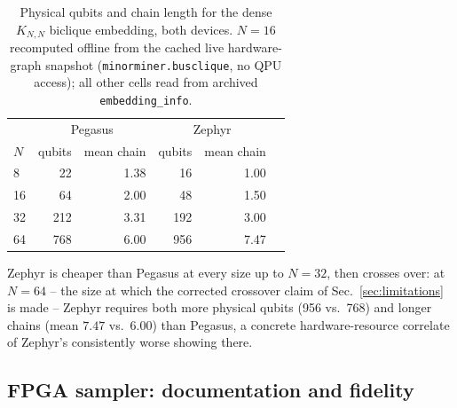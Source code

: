 \begin{table}[h]
\caption{Physical qubits and chain length for the dense $K_{N,N}$ biclique embedding, both devices. $N=16$ recomputed offline from the cached live hardware-graph snapshot (\texttt{minorminer.busclique}, no QPU access); all other cells read from archived \texttt{embedding\_info}.}
\label{tab:resources}
\begin{ruledtabular}
\begin{tabular}{lrrrrr}
& \multicolumn{2}{c}{Pegasus} & \multicolumn{2}{c}{Zephyr} \\
$N$ & qubits & mean chain & qubits & mean chain \\
\hline
8 & 22 & 1.38 & 16 & 1.00 \\
16 & 64 & 2.00 & 48 & 1.50 \\
32 & 212 & 3.31 & 192 & 3.00 \\
64 & 768 & 6.00 & 956 & 7.47 \\
\end{tabular}
\end{ruledtabular}
\end{table}

Zephyr is cheaper than Pegasus at every size up to $N=32$, then crosses over: at $N=64$ -- the size at which the corrected crossover claim of Sec.~\ref{sec:limitations} is made -- Zephyr requires both more physical qubits (956 vs.\ 768) and longer chains (mean $7.47$ vs.\ $6.00$) than Pegasus, a concrete hardware-resource correlate of Zephyr's consistently worse showing there.


\subsection{FPGA sampler: documentation and fidelity}
\label{sec:fpga}

